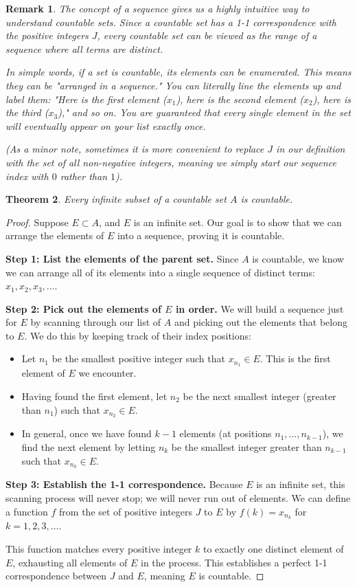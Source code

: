 \documentclass{article}
\theoremstyle{mythm}
\newtheorem{theorem}{Theorem}[section]
\newtheorem{remark}[theorem]{Remark}
\begin{document}
\begin{remark}
The concept of a sequence gives us a highly intuitive way to understand countable sets. Since a countable set has a 1-1 correspondence with the positive integers $J$, every countable set can be viewed as the range of a sequence where all terms are distinct. 

In simple words, if a set is countable, its elements can be \textit{enumerated}. This means they can be "arranged in a sequence." You can literally line the elements up and label them: "Here is the first element ($x_1$), here is the second element ($x_2$), here is the third ($x_3$)," and so on. You are guaranteed that every single element in the set will eventually appear on your list exactly once. 

(As a minor note, sometimes it is more convenient to replace $J$ in our definition with the set of all non-negative integers, meaning we simply start our sequence index with $0$ rather than $1$).
\end{remark}
\begin{theorem}
Every infinite subset of a countable set $A$ is countable.
\end{theorem}

\begin{proof}
Suppose $E \subset A$, and $E$ is an infinite set. Our goal is to show that we can arrange the elements of $E$ into a sequence, proving it is countable.

\textbf{Step 1: List the elements of the parent set.}
Since $A$ is countable, we know we can arrange all of its elements into a single sequence of distinct terms: $x_1, x_2, x_3, \dots$. 

\textbf{Step 2: Pick out the elements of $E$ in order.}
We will build a sequence just for $E$ by scanning through our list of $A$ and picking out the elements that belong to $E$. We do this by keeping track of their index positions:
\begin{itemize}
    \item Let $n_1$ be the smallest positive integer such that $x_{n_1} \in E$. This is the first element of $E$ we encounter.
    \item Having found the first element, let $n_2$ be the next smallest integer (greater than $n_1$) such that $x_{n_2} \in E$.
    \item In general, once we have found $k-1$ elements (at positions $n_1, \dots, n_{k-1}$), we find the next element by letting $n_k$ be the smallest integer greater than $n_{k-1}$ such that $x_{n_k} \in E$.
\end{itemize}

\textbf{Step 3: Establish the 1-1 correspondence.}
Because $E$ is an infinite set, this scanning process will never stop; we will never run out of elements. We can define a function $f$ from the set of positive integers $J$ to $E$ by $f(k) = x_{n_k}$ for $k = 1, 2, 3, \dots$. 

This function matches every positive integer $k$ to exactly one distinct element of $E$, exhausting all elements of $E$ in the process. This establishes a perfect 1-1 correspondence between $J$ and $E$, meaning $E$ is countable.
\end{proof}
\end{document}
